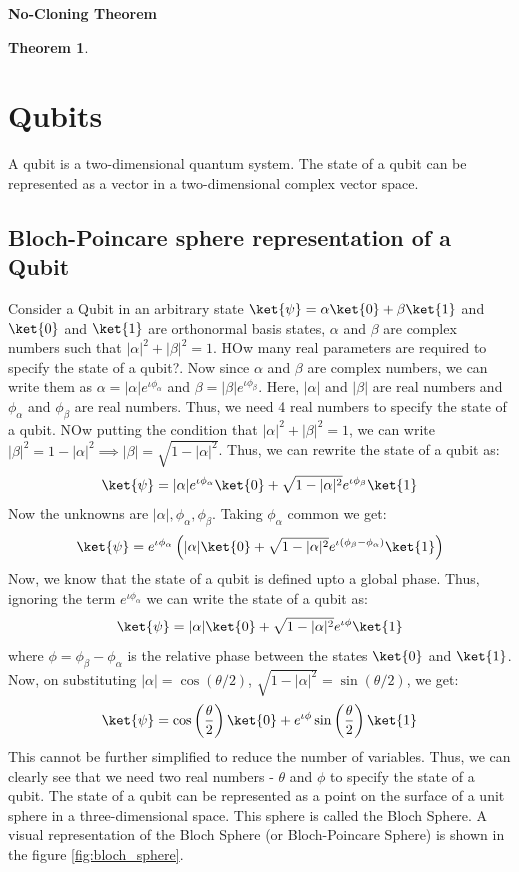 \documentclass[12pt, oneside]{book}
\newtheorem{theorem}{Theorem}[section]
\theoremstyle{definition}
\theoremstyle{definition}
\theoremstyle{remark}
\begin{document}
\begin{importantnote}
    \textbf{No-Cloning Theorem}
    \begin{theorem}

    \end{theorem}
\end{importantnote}



\chapter{Qubits}
A qubit is a two-dimensional quantum system. The state of a qubit can be represented as a vector in a two-dimensional complex vector space.

\section{Bloch-Poincare sphere representation of a Qubit}
Consider a Qubit in an arbitrary state $\ket{\psi}=\alpha\ket{0}+\beta\ket{1}$ and $\ket{0}$ and $\ket{1}$ are orthonormal basis states, $\alpha$ and $\beta$ are complex numbers such that $|\alpha|^2+|\beta|^2=1$.
HOw many real parameters are required to specify the state of a qubit?. Now since $\alpha$ and $\beta$ are complex numbers, we can write them as $\alpha=|\alpha|e^{\iota \phi_{\alpha}}$
and $\beta = |\beta| e^{\iota \phi_{\beta}}$. Here, $|\alpha|$ and $|\beta|$ are real numbers and $\phi_{\alpha}$ and $\phi_{\beta}$ are real numbers. Thus, we need 4 real numbers to specify the state of a qubit.
NOw putting the condition that $|\alpha|^2+|\beta|^2=1$, we can write $|\beta|^2=1-|\alpha|^2 \implies |\beta|=\sqrt{1-|\alpha|^2}$.
Thus, we can rewrite the state of a qubit as:
\[ 
    \ket{\psi}=|\alpha|e^{\iota \phi_{\alpha}}\ket{0}+\sqrt{1-|\alpha|^2}e^{\iota \phi_{\beta}}\ket{1}
\]
Now the unknowns are $|\alpha|,\phi_{\alpha},\phi_{\beta}$. Taking $\phi_{\alpha}$ common we get:
\[
    \ket{\psi}=e^{\iota \phi_{\alpha}}\left(|\alpha|\ket{0}+\sqrt{1-|\alpha|^2}e^{\iota(\phi_{\beta}-\phi_{\alpha})}\ket{1}\right)
\]
Now, we know that the state of a qubit is defined upto a global phase. Thus, ignoring the term
$e^{\iota \phi_{\alpha}}$ we can write the state of a qubit as:
\[
    \ket{\psi}=|\alpha|\ket{0}+\sqrt{1-|\alpha|^2}e^{\iota \phi}\ket{1}
\]
where $\phi=\phi_{\beta}-\phi_{\alpha}$ is the relative phase between the states $\ket{0}$ and $\ket{1}$. 
Now, on substituting $|\alpha|=\cos(\theta/2)$, $\sqrt{1-|\alpha|^2}=\sin(\theta/2)$, we get:
\[
    \ket{\psi}=\cos\left(\frac{\theta}{2}\right)\ket{0}+e^{\iota \phi}\sin\left(\frac{\theta}{2}\right)\ket{1}
\]
This cannot be further simplified to reduce the number of variables. Thus, we can clearly see that we need two real numbers - $\theta$ and $\phi$ to specify the state of a qubit.
The state of a qubit can be represented as a point on the surface of a unit sphere in a three-dimensional space. This sphere is called the Bloch Sphere.
A visual representation of the Bloch Sphere (or Bloch-Poincare Sphere) is shown in the figure \ref{fig:bloch_sphere}.
\end{document}
